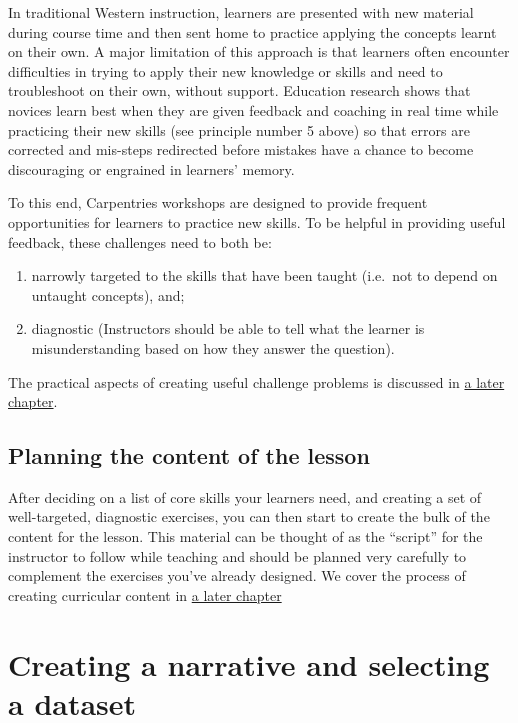\documentclass[
]{book}
\providecommand{\tightlist}{%
  \setlength{\itemsep}{0pt}\setlength{\parskip}{0pt}}
\begin{document}
In traditional Western instruction, learners are presented with new material during course time
and then sent home to practice applying the concepts learnt on their own. A major limitation of this
approach is that learners often encounter difficulties in trying to apply their new knowledge or skills
and need to troubleshoot on their own, without support. Education research shows that novices learn best when
they are given feedback and coaching in real time while practicing their new skills (see principle
number 5 above) so that errors are corrected and mis-steps redirected before mistakes have a chance to become
discouraging or engrained in learners' memory.

To this end, Carpentries workshops are designed to provide frequent opportunities for learners to practice new skills. To be
helpful in providing useful feedback, these challenges need to both be:

\begin{enumerate}
\def\labelenumi{\arabic{enumi}.}
\tightlist
\item
  narrowly targeted to the skills that have been taught (i.e.~not to depend
  on untaught concepts), and;
\item
  diagnostic (Instructors should be able to tell what the learner is
  misunderstanding based on how they answer the question).
\end{enumerate}

The practical aspects of creating useful challenge problems is discussed in \protect\hyperlink{designing-challenges-1}{a
later chapter}.

\hypertarget{planning-the-content-of-the-lesson}{%
\subsection{Planning the content of the lesson}\label{planning-the-content-of-the-lesson}}

After deciding on a list of core skills your learners need, and
creating a set of well-targeted, diagnostic exercises, you can
then start to create the bulk of the content for the lesson.
This material can be thought of as the ``script'' for the
instructor to follow while teaching and should be planned
very carefully to complement the exercises you've already
designed. We cover the process of creating curricular content
in \protect\hyperlink{developing-content}{a later chapter}

\hypertarget{creating-a-narrative-and-selecting-a-dataset}{%
\section{Creating a narrative and selecting a dataset}\label{creating-a-narrative-and-selecting-a-dataset}}
\end{document}
